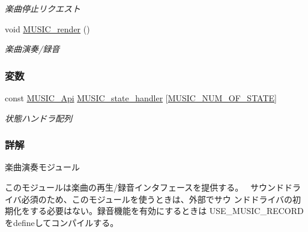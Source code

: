 \begin{DoxyCompactItemize}
\begin{DoxyCompactList}\small\item\em 楽曲停止リクエスト \end{DoxyCompactList}\item 
void \hyperlink{music_8h_a8c9b9d27f433de83744467ef60bc2bf1_a8c9b9d27f433de83744467ef60bc2bf1}{M\+U\+S\+I\+C\+\_\+render} ()
\begin{DoxyCompactList}\small\item\em 楽曲演奏/録音 \end{DoxyCompactList}\end{DoxyCompactItemize}
\subsubsection*{変数}
\begin{DoxyCompactItemize}
\item 
const \hyperlink{music_8h_a29e828a1710e2f01e14484306a5a35f6_a29e828a1710e2f01e14484306a5a35f6}{M\+U\+S\+I\+C\+\_\+\+Api} \hyperlink{music_8h_acb57fda4b6e51190cd6b34b9a2a48e1c_acb57fda4b6e51190cd6b34b9a2a48e1c}{M\+U\+S\+I\+C\+\_\+state\+\_\+handler} \mbox{[}\hyperlink{music_8h_a44fb51174ff72905a037ea2b766dc041_a44fb51174ff72905a037ea2b766dc041a693393721edbeba92e83b88506652a57}{M\+U\+S\+I\+C\+\_\+\+N\+U\+M\+\_\+\+O\+F\+\_\+\+S\+T\+A\+T\+E}\mbox{]}
\begin{DoxyCompactList}\small\item\em 状態ハンドラ配列 \end{DoxyCompactList}\end{DoxyCompactItemize}


\subsubsection{詳解}
楽曲演奏モジュール 

このモジュールは楽曲の再生/録音インタフェースを提供する。~\newline
サウンドドライバ必須のため、このモジュールを使うときは、外部でサウ ンドドライバの初期化をする必要はない。録音機能を有効にするときは U\+S\+E\+\_\+\+M\+U\+S\+I\+C\+\_\+\+R\+E\+C\+O\+R\+D をdefineしてコンパイルする。

